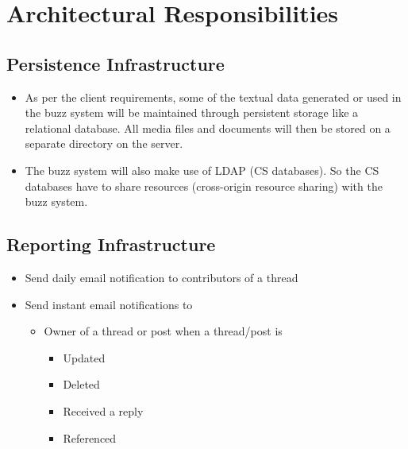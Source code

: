 \section{Architectural Responsibilities}
\subsection{Persistence Infrastructure}


\begin{itemize}
\item As per the client requirements, some of the textual data generated or used in the buzz system will be maintained through persistent storage like a relational database. All media files and documents will then be stored on a separate directory on the server.
\item The buzz system will also make use of LDAP (CS databases). So the CS databases have to share resources (cross-origin resource sharing) with the buzz system.
\end{itemize}


\subsection{Reporting Infrastructure}

\begin{itemize}
\item Send daily email notification to contributors of a thread
\item Send instant email notifications to 
	\begin{itemize} 
	\item Owner of a thread or post when a thread/post is \\
		\begin{itemize} 
			\item Updated 
			\item Deleted 
			\item Received a reply
			\item Referenced 	
		\end{itemize}
	\end{itemize}

\end{itemize}